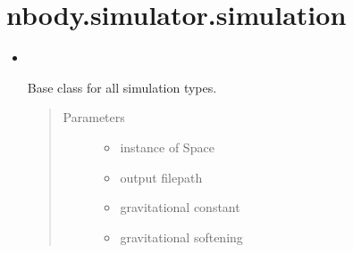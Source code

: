 \documentclass[letterpaper,10pt,english]{sphinxmanual}
\begin{document}
\section{nbody.simulator.simulation}
\label{\detokenize{simulator:nbody-simulator-simulation}}\label{\detokenize{simulator::doc}}\begin{itemize}
\item {} 

\begin{fulllineitems}
\label{\detokenize{simulator:nbody.simulator.simulation.SimulationBase}}~

\begin{fulllineitems}
\label{\detokenize{simulator:nbody.simulator.simulation.SimulationBase.__init__}}
\sphinxAtStartPar
Base class for all simulation types.
\begin{quote}\begin{description}
\item[{Parameters}] \leavevmode\begin{itemize}
\item {} 
\sphinxAtStartPar
{} \textendash{} instance of Space

\item {} 
\sphinxAtStartPar
{} \textendash{} output filepath

\item {} 
\sphinxAtStartPar
{} \textendash{} gravitational constant

\item {} 
\sphinxAtStartPar
{} \textendash{} gravitational softening

\end{itemize}


\end{description}
\end{quote}
\end{fulllineitems}
\end{fulllineitems}
\end{itemize}
\end{document}
